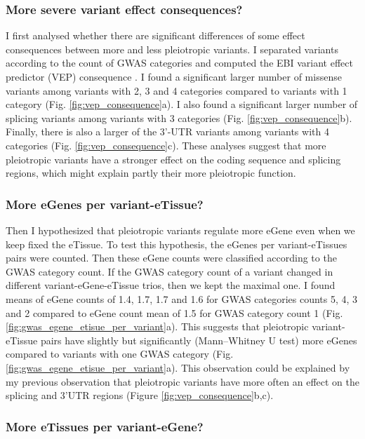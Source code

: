 \subsubsection*{More severe variant effect consequences?}

I first analysed whether there are significant differences of some effect consequences between more and less pleiotropic variants.
%
I separated variants according to the count of GWAS categories and computed the EBI variant effect predictor (VEP) consequence \citep{2016.Cunningham.McLaren}.
%
I found a significant larger number of missense variants among variants with 2, 3 and 4 categories compared to variants with 1 category (Fig. \ref{fig:vep_consequence}a).
%
I also found a significant larger number of splicing variants among variants with 3 categories (Fig. \ref{fig:vep_consequence}b).
%
Finally, there is also a larger of the 3'-UTR variants among variants with 4 categories (Fig. \ref{fig:vep_consequence}c).
%
These analyses suggest that more pleiotropic variants have a stronger effect on the coding sequence and splicing regions, which might explain partly their more pleiotropic function.

\subsubsection*{More eGenes per variant-eTissue?}

Then I hypothesized that pleiotropic variants regulate more eGene even when we keep fixed the eTissue.
%
To test this hypothesis, the eGenes per variant-eTissues pairs were counted.
%
Then these eGene counts were classified according to the GWAS category count.
%
If the GWAS category count of a variant changed in different variant-eGene-eTissue trios, then we kept the maximal one.
%
I found means of eGene counts of 1.4, 1.7, 1.7 and 1.6 for GWAS categories counts 5, 4, 3 and 2 compared to eGene count mean of 1.5 for GWAS category count 1 (Fig. \ref{fig:gwas_egene_etisue_per_variant}a).
%
This suggests that pleiotropic variant-eTissue pairs have slightly but significantly (Mann–Whitney U test) more eGenes compared to variants with one GWAS category (Fig. \ref{fig:gwas_egene_etisue_per_variant}a).
%
This observation could be explained by my previous observation that pleiotropic variants have more often an effect on the splicing and 3'UTR regions (Figure \ref{fig:vep_consequence}b,c).

\subsubsection*{More eTissues per variant-eGene?}

